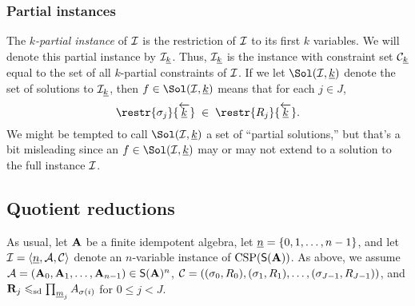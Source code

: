 \subsubsection{Partial instances}
The \emph{$k$-partial instance} of $\mathcal{I}$ is the restriction of
$\mathcal{I}$ to its first $k$ variables.  We will denote this partial instance
by $\mathcal{I}_{\underline{k}}$. Thus, $\mathcal{I}_{\underline{k}}$ is the instance with constraint set
$\mathcal{C}_{\underline{k}}$ equal to the set of all $k$-partial constraints of $\mathcal{I}$.
If we let $\Sol(\sI, \kk)$ denote the set of solutions to $\mathcal{I}_{\underline{k}}$,
then $f \in  \Sol(\sI, \kk)$ means that for each $j \in J$,
\[
\restr{\sigma_j}{\overleftarrow{\kk}}\; \in\;
\restr{R_j}{\overleftarrow{\kk}}. %
\]
We might be tempted to call $\Sol(\sI, \kk)$ a set of ``partial solutions,''
but that's a bit misleading since an $f \in \Sol(\sI, \kk)$ may or may not
extend to a solution to the full instance $\mathcal{I}$.

\subsection{Quotient reductions}
As usual, let $\mathbf{A}$ be a finite idempotent algebra, let
$\underline{n} = \{0, 1, \dots, n-1\}$, and let
$\mathcal{I} = \langle \underline{n}, \mathcal{A}, \mathcal C\rangle$
denote an $n$-variable instance of $\operatorname{CSP}(\mathsf{S}(\mathbf{A}))$.
As above, we assume
$\mathcal{A} = (\mathbf{A}_0, \mathbf{A}_1, \dots, \mathbf{A}_{n-1}) \in \mathsf{S}(\mathbf{A})^n$,
$\mathcal{C} = ((\sigma_0, R_0), (\sigma_1, R_1), \dots, (\sigma_{J-1}, R_{J-1}))$,
and $\mathbf{R}_j\leqslant_{\mathrm{sd}} \prod_{\underline{m}_j} A_{\sigma(i)}$ for $0\leq j < J$.

